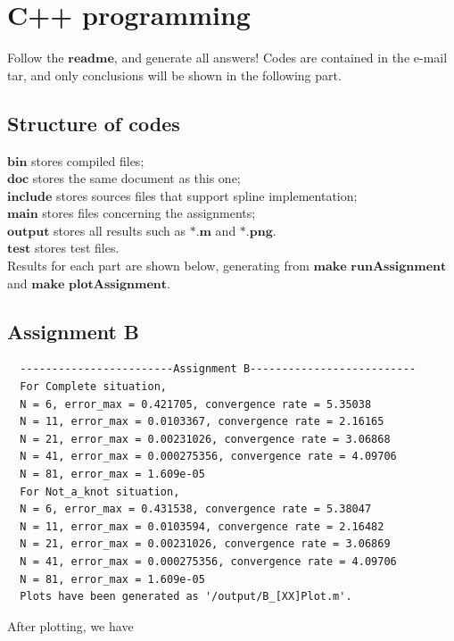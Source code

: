 \documentclass{article}
\begin{document}
\section{C++ programming}
Follow the $\textbf{readme}$, and generate all answers! 
Codes are contained in the e-mail tar, and only conclusions will be shown in the following part.

\subsection{\textbf{Structure of codes}}
$\textbf{bin}$ stores compiled files;\\
$\textbf{doc}$ stores the same document as this one;\\
$\textbf{include}$ stores sources files that support spline implementation;\\
$\textbf{main}$ stores files concerning the assignments;\\
$\textbf{output}$ stores all results such as $\textbf{*.m}$ and $\textbf{*.png}$.\\
$\textbf{test}$ stores test files.\\
Results for each part are shown below, generating from $ \textbf{make runAssignment} $ and $ \textbf{make plotAssignment} $.
\subsection{\textbf{Assignment B}}
\lstset{language=C++}
\begin{lstlisting}
  ------------------------Assignment B--------------------------
  For Complete situation, 
  N = 6, error_max = 0.421705, convergence rate = 5.35038
  N = 11, error_max = 0.0103367, convergence rate = 2.16165
  N = 21, error_max = 0.00231026, convergence rate = 3.06868
  N = 41, error_max = 0.000275356, convergence rate = 4.09706
  N = 81, error_max = 1.609e-05
  For Not_a_knot situation, 
  N = 6, error_max = 0.431538, convergence rate = 5.38047
  N = 11, error_max = 0.0103594, convergence rate = 2.16482
  N = 21, error_max = 0.00231026, convergence rate = 3.06869
  N = 41, error_max = 0.000275356, convergence rate = 4.09706
  N = 81, error_max = 1.609e-05
  Plots have been generated as '/output/B_[XX]Plot.m'.
\end{lstlisting}
After plotting, we have
\end{document}
